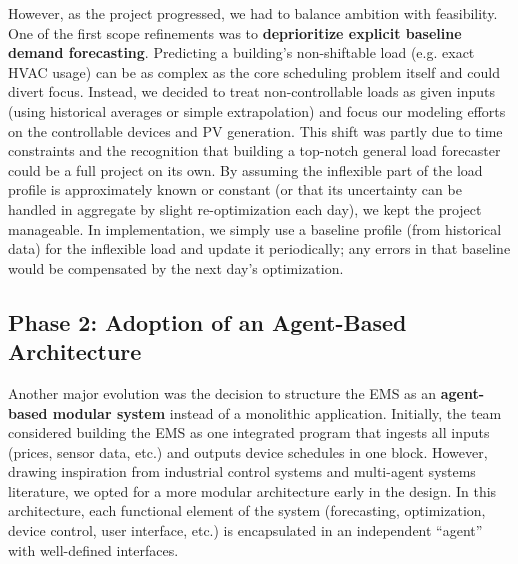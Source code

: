 \documentclass[12pt,a4paper]{article}
\begin{document}
However, as the project progressed, we had to balance ambition with feasibility. One of the first scope refinements was to \textbf{deprioritize explicit baseline demand forecasting}. Predicting a building’s non-shiftable load (e.g. exact HVAC usage) can be as complex as the core scheduling problem itself and could divert focus. Instead, we decided to treat non-controllable loads as given inputs (using historical averages or simple extrapolation) and focus our modeling efforts on the controllable devices and PV generation. This shift was partly due to time constraints and the recognition that building a top-notch general load forecaster could be a full project on its own. By assuming the inflexible part of the load profile is approximately known or constant (or that its uncertainty can be handled in aggregate by slight re-optimization each day), we kept the project manageable. In implementation, we simply use a baseline profile (from historical data) for the inflexible load and update it periodically; any errors in that baseline would be compensated by the next day’s optimization.

\subsection{Phase 2: Adoption of an Agent-Based Architecture}
Another major evolution was the decision to structure the EMS as an \textbf{agent-based modular system} instead of a monolithic application. Initially, the team considered building the EMS as one integrated program that ingests all inputs (prices, sensor data, etc.) and outputs device schedules in one block. However, drawing inspiration from industrial control systems and multi-agent systems literature, we opted for a more modular architecture early in the design. In this architecture, each functional element of the system (forecasting, optimization, device control, user interface, etc.) is encapsulated in an independent “agent” with well-defined interfaces. 
\end{document}
